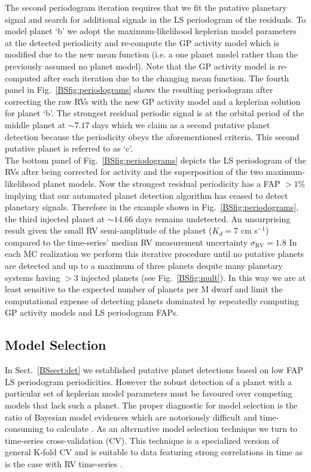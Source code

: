The second periodogram iteration requires that we fit the putative planetary signal and search for
additional signals in the LS periodogram of the residuals. To model planet `b'
we adopt the maximum-likelihood keplerian model parameters at the detected periodicity
and re-compute the GP activity model which is modified due to the new mean function (i.e. a one planet model
rather than the previously assumed no planet model). Note that the GP activity model is re-computed after each
iteration due to the changing mean function. The fourth panel in Fig.~\ref{BSfig:periodograms} shows
the resulting periodogram after correcting the raw RVs with the new GP activity model and a keplerian solution
for planet `b'. The strongest residual
periodic signal is at the orbital period of the middle planet at $\sim 7.17$ days which
we claim as a second putative planet detection because the periodicity obeys the aforementioned criteria.
This second putative planet is referred to as `c'. \\

The bottom panel of Fig.~\ref{BSfig:periodograms} depicts the LS periodogram of the RVs after being
corrected for activity and the superposition of the two maximum-likelihood planet models. Now the strongest
residual periodicity has a FAP $>1$\% implying that our automated planet detection algorithm has ceased to
detect planetary signals. Therefore in the example shown in Fig.~\ref{BSfig:periodograms}, the
third injected planet at $\sim 14.66$ days remains undetected. An unsurprising result given the small RV
semi-amplitude of the planet ($K_d=7$ cm s$^{-1}$) compared to the time-series' median RV measurement
uncertainty $\sigma_{\text{RV}}=1.8$  In each MC realization we perform this iterative procedure
until no putative planets are detected and up to
a maximum of three planets despite many planetary systems having $>3$ injected planets
(see Fig.~\ref{BSfig:mult}). In this way we are at least
sensitive to the expected number of planets per M dwarf \citep[$2.5 \pm 0.2$;][]{dressing15a} 
and limit the computational expense of detecting planets dominated by repeatedly computing GP activity
models and LS periodogram FAPs.


\subsection{Model Selection} \label{BSsect:CV}
In Sect.~\ref{BSsect:det} we established putative planet detections based on low FAP LS periodogram
periodicities. However the robust detection of a planet with a particular set of keplerian model parameters
must be favoured over competing models that lack such a planet. The proper diagnostic for model
selection is the ratio of Bayesian model evidences which are
notoriously difficult and time-consuming to calculate \citep{ford07}. 
As an alternative model selection technique we turn to time-series
cross-validation (CV). This technique is a specialized version of general K-fold CV
and is suitable to data featuring strong correlations in time as is the case with RV time-series
\citep{arlot10}. \\

